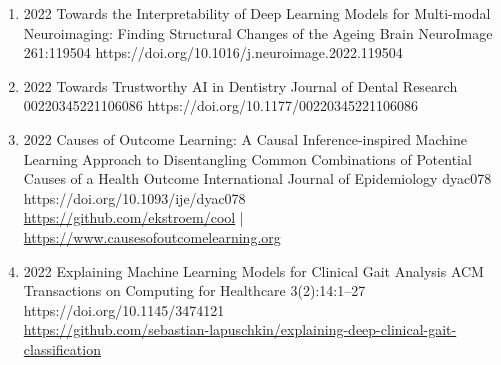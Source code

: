 {\begin{enumerate}
                        
    \item {}
                        {2022}
                        {Towards the Interpretability of Deep Learning Models for Multi-modal Neuroimaging: Finding Structural Changes of the Ageing Brain}
                        {NeuroImage}
                        {261:119504}
                        {https://doi.org/10.1016/j.neuroimage.2022.119504}

    \item {}
                        {2022}
                        {Towards Trustworthy AI in Dentistry}
                        {Journal of Dental Research}
                        {00220345221106086}
                        {https://doi.org/10.1177/00220345221106086}


    \item {}
                        {2022}
                        {Causes of Outcome Learning: A Causal Inference-inspired Machine Learning Approach to Disentangling Common Combinations of Potential Causes of a Health Outcome}
                        {International Journal of Epidemiology}
                        {dyac078}
                        {https://doi.org/10.1093/ije/dyac078}
                        {\\\href{https://github.com/ekstroem/cool}{https://github.com/ekstroem/cool} | 
                         \href{https://www.causesofoutcomelearning.org}{https://www.causesofoutcomelearning.org}
                        }

    \item {}
                        {2022}
                        {Explaining Machine Learning Models for Clinical Gait Analysis}
                        {ACM Transactions on Computing for Healthcare}
                        {3(2):14:1--27}
                        {https://doi.org/10.1145/3474121}
                        {\\\href{https://github.com/sebastian-lapuschkin/explaining-deep-clinical-gait-classification}{https://github.com/sebastian-lapuschkin/explaining-deep-clinical-gait-classification}}



\end{enumerate}}
